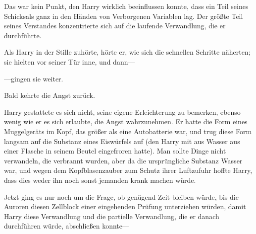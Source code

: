 Das war kein Punkt, den Harry wirklich beeinflussen konnte, dass ein Teil seines Schicksals ganz in den Händen von Verborgenen Variablen lag. Der größte Teil seines Verstandes konzentrierte sich auf die laufende Verwandlung, die er durchführte.

Als Harry in der Stille zuhörte, hörte er, wie sich die schnellen Schritte näherten; sie hielten vor seiner Tür inne, und dann—

—gingen sie weiter.

Bald kehrte die Angst zurück.

Harry gestattete es sich nicht, seine eigene Erleichterung zu bemerken, ebenso wenig wie er es sich erlaubte, die Angst wahrzunehmen. Er hatte die Form eines Muggelgeräts im Kopf, das größer als eine Autobatterie war, und trug diese Form langsam auf die Substanz eines Eiswürfels auf (den Harry mit  aus Wasser aus einer Flasche in seinem Beutel eingefroren hatte). Man sollte Dinge nicht verwandeln, die verbrannt wurden, aber da die ursprüngliche Substanz Wasser war, und wegen dem Kopfblasenzauber zum Schutz ihrer Luftzufuhr hoffte Harry, dass dies weder ihn noch sonst jemanden krank machen würde.

Jetzt ging es nur noch um die Frage, ob genügend Zeit bleiben würde, bis die Auroren diesen Zellblock einer eingehenden Prüfung unterziehen würden, damit Harry diese Verwandlung und die partielle Verwandlung, die er danach durchführen würde, abschließen konnte—

